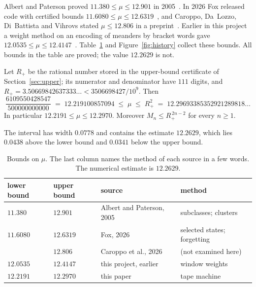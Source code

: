 Albert and Paterson proved $11.380\le\mu\le12.901$ in 2005~\cite{AP}. In 2026 Fox released code with certified bounds
$11.6080\le\mu\le12.6319$~\cite{Fox}, and Caroppo, Da~Lozzo, Di~Battista and Vihrovs stated $\mu\le12.806$ in a
preprint~\cite{CDDV}. Earlier in this project a weight method on an encoding of meanders by bracket words gave
$12.0535\le\mu\le12.4147$~\cite{BoundsPaper}. Table~\ref{tab:history} and Figure~\ref{fig:history} collect these
bounds. All bounds in the table are proved; the value $12.2629$ is not.

\begin{theorem}\label{thm:main}
Let $R_+$ be the rational number stored in the upper-bound certificate of Section~\ref{sec:upper}; its numerator and
denominator have $111$ digits, and $R_+=3.50669842637333\ldots<3506698427/10^9$. Then
\[ \frac{6109550428547}{500000000000} \;=\; 12.219100857094 \;\le\; \mu \;\le\; R_+^2 \;=\; 12.29693385352921289818\ldots \]
In particular $12.2191\le\mu\le12.2970$. Moreover $M_n\le R_+^{\,2n-2}$ for every $n\ge1$.
\end{theorem}

The interval has width $0.0778$ and contains the estimate $12.2629$, which lies $0.0438$ above the lower bound and
$0.0341$ below the upper bound.

\begin{table}[htb]
\centering
\begin{tabular}{llll}
\toprule
lower bound & upper bound & source & method \\
\midrule
$11.380$ & $12.901$ & Albert and Paterson, 2005~\cite{AP} & subclasses; clusters\\
$11.6080$ & $12.6319$ & Fox, 2026~\cite{Fox} & selected states; forgetting\\
 & $12.806$ & Caroppo et al., 2026~\cite{CDDV} & (not examined here)\\
$12.0535$ & $12.4147$ & this project, earlier~\cite{BoundsPaper} & window weights\\
$12.2191$ & $12.2970$ & this paper & tape machine\\
\bottomrule
\end{tabular}
\caption{Bounds on $\mu$. The last column names the method of each source in a few words. The numerical estimate
is $12.2629$.}
\label{tab:history}
\end{table}

